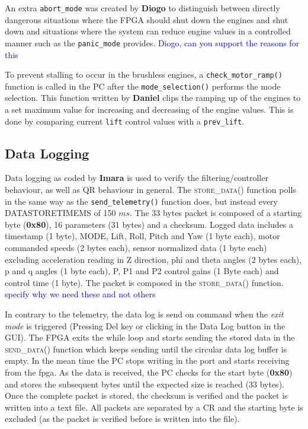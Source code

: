 \documentclass{article}
\newcommand\todo[1]{\textcolor{blue}{#1}} %
\begin{document}
An extra \texttt{abort\_mode} was created by \textbf{Diogo} to distinguish between directly dangerous situations where the FPGA should shut down the engines and shut down and situations where the system can reduce engine values in a controlled manner such as the \texttt{panic\_mode} provides. \todo{Diogo, can you support the reasons for this}

To prevent stalling to occur in the brushless engines, a \texttt{check\_motor\_ramp()} function is called in the PC after the \texttt{mode\_selection()} performs the mode selection. This function written by \textbf{Daniel} clips the ramping up of the engines to a set maximum value for increasing and decreasing of the engine values. This is done by comparing current \texttt{lift} control values with a \texttt{prev\_lift}. 

\subsection{Data Logging}

Data logging as coded by \textbf{Imara} is used to verify the filtering/controller behaviour, as well as QR behaviour in general. The \textsc{store\_data()} function polls in the same way as the \texttt{send\_telemetry()} function does, but instead every \textsc{DATASTORETIMEMS} of 150 $ms$. The 33 bytes packet is composed of a starting byte (\textbf{0x80}), 16 parameters (31 bytes) and a checksum. Logged data includes a timestamp (1 byte), MODE, Lift, Roll, Pitch and Yaw (1 byte each), motor commanded speeds (2 bytes each), sensor normalized data (1 byte each) excluding acceleration reading in Z direction, phi and theta angles (2 bytes each), p and q angles (1 byte each), P, P1 and P2 control gains (1 Byte each) and control time (1 byte). The packet is composed in the \textsc{store\_data()} function. \todo{specify why we need these and not others}

In contrary to the telemetry, the data log is send on command when the \emph{exit mode} is triggered (Pressing Del key or clicking in the Data Log button in the GUI). The FPGA exits the while loop and starts sending the stored data in the \textsc{send\_data()} function which keeps sending until the circular data log buffer is empty. In the mean time the PC stops writing in the port and starts receiving from the fpga. As the data is received, the PC checks for the start byte (\textbf{0x80}) and stores the subsequent bytes until the expected size is reached (33 bytes). Once the complete packet is stored, the checksum is verified and the packet is written into a text file. All packets are separated by a CR and the starting byte is excluded (as the packet is verified before is written into the file).
\end{document}
